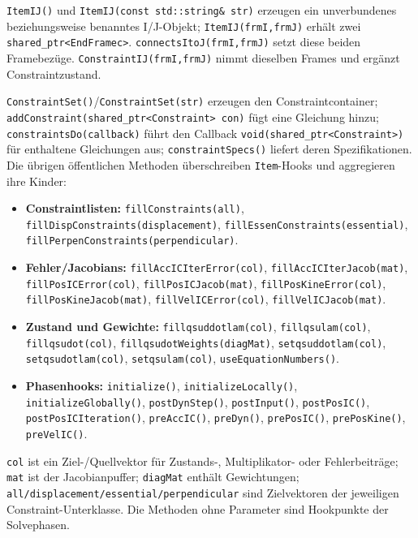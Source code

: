 \documentclass[
  12pt
]{book}
\providecommand{\tightlist}{%
  \setlength{\itemsep}{0pt}\setlength{\parskip}{0pt}}
\begin{document}
\texttt{ItemIJ()} und \texttt{ItemIJ(const\ std::string\&\ str)}
erzeugen ein unverbundenes beziehungsweise benanntes I/J-Objekt;
\texttt{ItemIJ(frmI,frmJ)} erhält zwei
\texttt{shared\_ptr\textless{}EndFramec\textgreater{}}.
\texttt{connectsItoJ(frmI,frmJ)} setzt diese beiden Framebezüge.
\texttt{ConstraintIJ(frmI,frmJ)} nimmt dieselben Frames und ergänzt
Constraintzustand.

\texttt{ConstraintSet()}/\texttt{ConstraintSet(str)} erzeugen den
Constraintcontainer;
\texttt{addConstraint(shared\_ptr\textless{}Constraint\textgreater{}\ con)}
fügt eine Gleichung hinzu; \texttt{constraintsDo(callback)} führt den
Callback \texttt{void(shared\_ptr\textless{}Constraint\textgreater{})}
für enthaltene Gleichungen aus; \texttt{constraintSpecs()} liefert deren
Spezifikationen. Die übrigen öffentlichen Methoden überschreiben
\texttt{Item}-Hooks und aggregieren ihre Kinder:

\begin{itemize}
\tightlist
\item
  \textbf{Constraintlisten:} \texttt{fillConstraints(all)},
  \texttt{fillDispConstraints(displacement)},
  \texttt{fillEssenConstraints(essential)},
  \texttt{fillPerpenConstraints(perpendicular)}.
\item
  \textbf{Fehler/Jacobians:} \texttt{fillAccICIterError(col)},
  \texttt{fillAccICIterJacob(mat)}, \texttt{fillPosICError(col)},
  \texttt{fillPosICJacob(mat)}, \texttt{fillPosKineError(col)},
  \texttt{fillPosKineJacob(mat)}, \texttt{fillVelICError(col)},
  \texttt{fillVelICJacob(mat)}.
\item
  \textbf{Zustand und Gewichte:} \texttt{fillqsuddotlam(col)},
  \texttt{fillqsulam(col)}, \texttt{fillqsudot(col)},
  \texttt{fillqsudotWeights(diagMat)}, \texttt{setqsuddotlam(col)},
  \texttt{setqsudotlam(col)}, \texttt{setqsulam(col)},
  \texttt{useEquationNumbers()}.
\item
  \textbf{Phasenhooks:} \texttt{initialize()},
  \texttt{initializeLocally()}, \texttt{initializeGlobally()},
  \texttt{postDynStep()}, \texttt{postInput()}, \texttt{postPosIC()},
  \texttt{postPosICIteration()}, \texttt{preAccIC()}, \texttt{preDyn()},
  \texttt{prePosIC()}, \texttt{prePosKine()}, \texttt{preVelIC()}.
\end{itemize}

\texttt{col} ist ein Ziel-/Quellvektor für Zustands-, Multiplikator-
oder Fehlerbeiträge; \texttt{mat} ist der Jacobianpuffer;
\texttt{diagMat} enthält Gewichtungen;
\texttt{all/displacement/essential/perpendicular} sind Zielvektoren der
jeweiligen Constraint-Unterklasse. Die Methoden ohne Parameter sind
Hookpunkte der Solvephasen.
\end{document}

